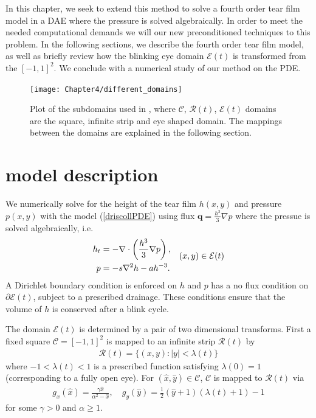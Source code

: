 In this chapter, we seek to extend this method to solve a fourth order tear film model in a DAE where the pressure is solved algebraically. In order to meet the needed computational demands we will our new preconditioned techniques to this problem. In the following sections, we describe the fourth order tear film model, as well as briefly review how the blinking eye domain $\mathcal{E}(t)$ is transformed from the $[-1,1]^2$. We conclude with a numerical study of our method on the PDE.


\begin{figure}
  \centering
  \texttt{[image: Chapter4/different\_domains]}
  \caption{Plot of the subdomains used in \cite{driscoll2018simulation}, where $\mathcal{C}$, $\mathcal{R}(t)$, $\mathcal{E}(t)$ domains are the square, infinite strip and eye shaped domain. The mappings between the domains are explained in the following section.}
  \label{driscoll_eye}
\end{figure}
	
\section{model description}

We numerically solve for the height of the tear film $h(x,y)$ and pressure $p(x,y)$ with the model (\ref{driscollPDE}) using flux $\bm{q} =  \frac{h^3}{3} \nabla p$ where the pressue is solved algebraically, i.e.
\begin{align}
\begin{aligned}
h_t &= - \nabla \cdot \left( \frac{h^3}{3} \nabla p \right), \\
p &= - s \nabla^2 h - a h^{-3}.
\end{aligned} \quad (x,y) \in \mathcal{E}(t)
\label{the_pde}
\end{align}
A Dirichlet boundary condition is enforced on $h$ and $p$ has a no flux condition on $\partial \mathcal{E}(t)$, subject to a prescribed drainage. These conditions ensure that the volume of $h$ is conserved after a blink cycle.

The domain $\mathcal{E}(t)$ is determined by a pair of two dimensional transforms. First a fixed square $\mathcal{C}=[-1,1]^2$ is mapped to an infinite strip $\mathcal{R}(t)$ by
\begin{align}
\mathcal{R}(t) = \{(x,y):|y|<\lambda(t)\}	
\end{align}
where $-1<\lambda(t)<1$ is a prescribed function satisfying $\lambda(0)=1$ (corresponding to a fully open eye). For $(\hat{x},\hat{y}) \in \mathcal{C}$, $\mathcal{C}$ is mapped to $\mathcal{R}(t)$ via
\begin{align}
	g_x(\hat{x}) = \frac{\gamma \hat{x}}{\alpha^2 - \hat{x}}, \quad g_y(\hat{y}) = \frac{1}{2} (\hat{y}+1)(\lambda(t)+1)-1
\end{align}
for some $\gamma>0$ and $\alpha \geq 1$.


